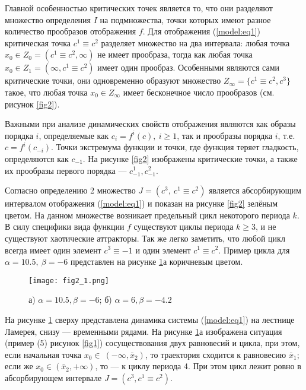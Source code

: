 \documentclass[a4paper, 14pt]{extreport}
\numberwithin{equation}{section}
\numberwithin{figure}{section}
\numberwithin{table}{section}
\begin{document}
		Главной особенностью критических точек является то, что они разделяют множество определения $ I $ на подмножества, точки которых имеют разное количество прообразов отображения $ f $. Для отображения (\ref{model:eq1}) критическая точка $ c^{1} \equiv c^{2} $ разделяет множество на два интервала: любая точка $ x_{0} \in Z_{0} = (c^{1} \equiv c^{2}, \infty) $ не имеет прообраза, тогда как любая точка $ x_{0} \in Z_{1} = (\infty, c^{1} \equiv c^{2}) $ имеет один прообраз. Особенными являются сами критические точки, они одновременно образуют множество $ Z_{\infty} = \{ c^{1} \equiv c^{2}, c^{3} \} $ такое, что любая точка $ x_{0} \in Z_{\infty} $ имеет бесконечное число прообразов (см. рисунок \ref{fig2}). %

		Важными при анализе динамических свойств отображения являются как образы порядка $ i $, определяемые как $ c_{i} = f^{i}(c),~i \geq 1 $, так и прообразы порядка $ i $, т.е. $ c = f^{i}(c_{-i}) $. Точки экстремума функции и точки, где функция теряет гладкость, определяются как $ c_{-1} $. На рисунке \ref{fig2} изображены критические точки, а также их прообразы первого порядка --- $ c^{1}_{-1}, c^{2}_{-1} $. %

		Согласно определению 2 множество $ J = (c^{3},~c^{1} \equiv c^{2}) $ является абсорбирующим интервалом отображения (\ref{model:eq1}) и показан на рисунке \ref{fig2} зелёным цветом. На данном множестве возникает предельный цикл некоторого периода $ k $. В силу специфики вида функции $ f $ существуют циклы периода $ k \geq 3 $, и не существуют хаотические аттракторы. Так же легко заметить, что любой цикл всегда имеет один элемент $ c^{3} \equiv -1 $ и один элемент $ c^{1} \equiv c^{2} $. Пример цикла для $ \alpha = 10.5,~\beta = -6 $ представлен на рисунке \ref{fig2_1}а коричневым цветом. %
		
		\begin{figure}[h!]
			\begin{center}
				\texttt{[image: fig2\_1.png]}
			\end{center}
			\caption{а) $ \alpha = 10.5, \beta = -6 $; б) $ \alpha = 6, \beta = -4.2 $}
			\label{fig2_1}		
		\end{figure}

		На рисунке \ref{fig2_1} сверху представлена динамика системы (\ref{model:eq1}) на лестнице Ламерея, снизу --- временными рядами. На рисунке \ref{fig2_1}а изображена ситуация (пример (5) рисунок \ref{fig1}) сосуществования двух равновесий и цикла, при этом, если начальная точка $ x_{0} \in~(-\infty, \bar{x}_{2}) $, то траектория сходится к равновесию $ \bar{x}_{1} $; если же $ x_{0} \in (\bar{x}_{2}, +\infty) $, то --- к циклу периода 4. При этом цикл лежит ровно в абсорбирующем интервале $ J =  (c^{3}, c^{1} \equiv c^{2}) $. %
\end{document}
